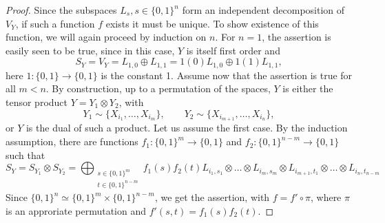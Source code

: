\documentclass[12pt]{article}
\theoremstyle{definition}
\theoremstyle{remark}
\begin{document}
\begin{proof} Since the subspaces  $L_s, s\in \{0,1\}^n$ form an independent decomposition
of $V_Y$, if such a function $f$ exists it must be unique. To show existence of this
function, we will again proceed by induction on $n$. For $n=1$, the assertion is easily seen
to be true, since in this case, $Y$ is itself first order and
\[
S_Y=V_Y=L_{1,0}\oplus L_{1,1}=1(0)L_{1,0}\oplus 1(1)L_{1,1},
\]
here $1:\{0,1\}\to \{0,1\}$ is the constant 1. Assume now that the assertion is true for
all $m<n$. By construction,  up to a permutation of the spaces, $Y$ is either the tensor product $Y=Y_1\otimes Y_2$, with
\[
Y_1\sim \{X_{i_1},\dots, X_{i_m}\},\qquad Y_2\sim\{X_{i_{m+1}},\dots, X_{i_n}\},
\]
 or $Y$ is the dual of such a product. Let us assume the first case.  By the induction 
assumption, there are functions $f_1:\{0,1\}^{m}\to \{0,1\}$ and $f_2:\{0,1\}^{n-m}\to
\{0,1\}$ such that
\[
S_Y=S_{Y_1}\otimes S_{Y_2}=\bigoplus_{\substack{s\in\{0,1\}^{m}\\ t\in
\{0,1\}^{n-m}}}
f_1(s)f_2(t)L_{i_1,s_{1}}\otimes\dots \otimes L_{i_m,s_{m}}\otimes
L_{i_{m+1},t_{1}}\otimes\dots\otimes L_{i_n,t_{n-m}}
\]
Since $\{0,1\}^n\simeq \{0,1\}^m\times \{0,1\}^{n-m}$, we get the assertion, with
$f=f'\circ \pi$, where $\pi$ is an approriate permutation  and 
$f'(s,t)=f_1(s)f_2(t)$.


\end{proof}
\end{document}
